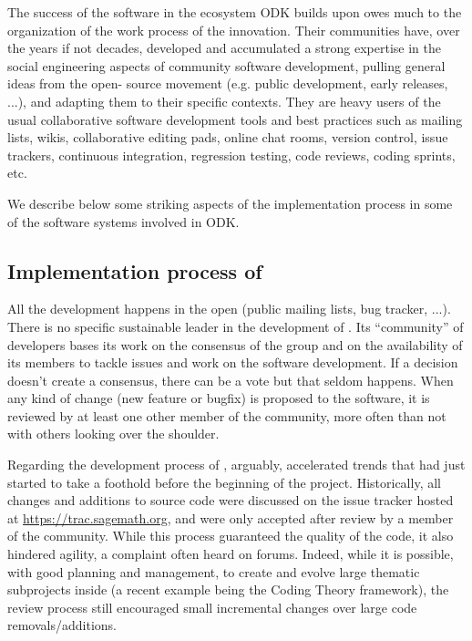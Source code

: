 \documentclass{deliverablereport}
\begin{document}
The success of the software in the ecosystem ODK builds upon owes much
to the organization of the work process of the innovation.
Their
communities have, over the years if not decades, developed and
accumulated a strong expertise in the social engineering aspects of
community software development, pulling general ideas from the open-
source movement (e.g. public development, early releases, ...), and
adapting them to their specific contexts. They are heavy users of the
usual collaborative software development tools and best practices such
as mailing lists, wikis, collaborative editing pads, online chat
rooms, version control, issue trackers, continuous integration,
regression testing, code reviews, coding sprints, etc.

We describe below some striking aspects of the implementation process
in some of the software systems involved in ODK.

\subsection{Implementation process of \Sage}

All the development happens in the open (public mailing lists, bug
tracker, ...). There is no specific sustainable leader in the
development of \Sage. Its ``community'' of developers bases its work on
the consensus of the group and on the availability of its members to
tackle issues and work on the software development. If a decision
doesn't create a consensus, there can be a vote but that seldom
happens. When any kind of change (new feature or bugfix)
is proposed to the software, it is reviewed
by at least one other member of the community, more often than not
with others looking over the shoulder.

Regarding the development process of \Sage, arguably, \ODK accelerated
trends that had just started to take a foothold before the beginning
of the project. %
Historically, all changes and additions to \Sage source code were
discussed on the issue tracker hosted at
\url{https://trac.sagemath.org}, and were only accepted after review
by a member of the community. %
While this process guaranteed the quality of the code, it also
hindered agility, a complaint often heard on \Sage forums. %
Indeed, while it is possible, with good planning and management, to
create and evolve large thematic subprojects inside \Sage (a recent
example being the Coding Theory framework), the review process still
encouraged small incremental changes over large code
removals/additions.
\end{document}
